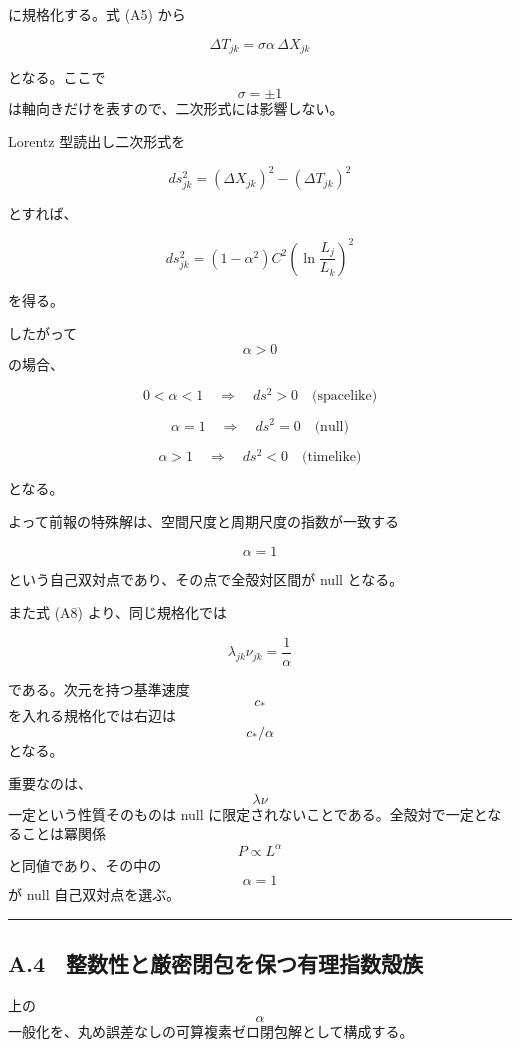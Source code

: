\documentclass[
  a4paper,
]{ltjsarticle}
\begin{document}
に規格化する。式 (A5) から

\[
\Delta T_{jk}
=
\sigma\alpha\,\Delta X_{jk}
\]

となる。ここで \[\sigma=\pm1\]
は軸向きだけを表すので、二次形式には影響しない。

Lorentz 型読出し二次形式を

\[
ds_{jk}^2
=
(\Delta X_{jk})^2
-
(\Delta T_{jk})^2
\tag{A10}
\]

とすれば、

\[
\boxed{
 ds_{jk}^2
=
(1-\alpha^2)
C^2
\left(
\ln\frac{L_j}{L_k}
\right)^2
}
\tag{A11}
\]

を得る。

したがって \[\alpha>0\] の場合、

\[
\boxed{
0<\alpha<1
\quad\Longrightarrow\quad
 ds^2>0
\quad\text{(spacelike)}
}
\tag{A12}
\]

\[
\boxed{
\alpha=1
\quad\Longrightarrow\quad
 ds^2=0
\quad\text{(null)}
}
\tag{A13}
\]

\[
\boxed{
\alpha>1
\quad\Longrightarrow\quad
 ds^2<0
\quad\text{(timelike)}
}
\tag{A14}
\]

となる。

よって前報の特殊解は、空間尺度と周期尺度の指数が一致する

\[
\boxed{
\alpha=1
}
\]

という自己双対点であり、その点で全殻対区間が null となる。

また式 (A8) より、同じ規格化では

\[
\boxed{
\lambda_{jk}\nu_{jk}
=
\frac{1}{\alpha}
}
\tag{A15}
\]

である。次元を持つ基準速度 \[c_*\] を入れる規格化では右辺は
\[c_*/\alpha\] となる。

重要なのは、\[\lambda\nu\] 一定という性質そのものは null
に限定されないことである。全殻対で一定となることは冪関係
\[P\propto L^\alpha\] と同値であり、その中の \[\alpha=1\] が null
自己双対点を選ぶ。

\begin{center}\rule{0.5\linewidth}{0.5pt}\end{center}

\subsection{A.4　整数性と厳密閉包を保つ有理指数殻族}\label{a.4-ux6574ux6570ux6027ux3068ux53b3ux5bc6ux9589ux5305ux3092ux4fddux3064ux6709ux7406ux6307ux6570ux6bbbux65cf}

上の \[\alpha\]
一般化を、丸め誤差なしの可算複素ゼロ閉包解として構成する。
\end{document}
